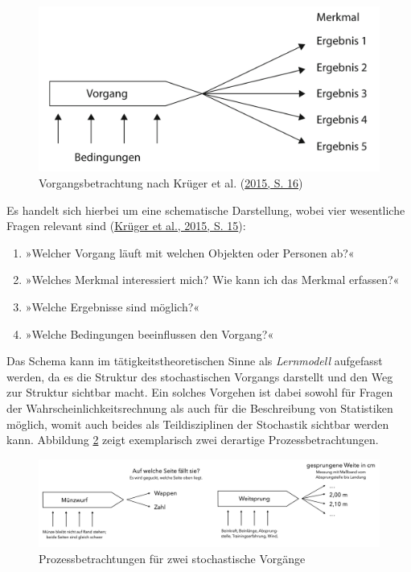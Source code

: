 \documentclass[
]{scrbook}
\providecommand{\tightlist}{%
  \setlength{\itemsep}{0pt}\setlength{\parskip}{0pt}}
\theoremstyle{definition}
\theoremstyle{definition}
\theoremstyle{definition}
\theoremstyle{definition}
\theoremstyle{remark}
\begin{document}
\begin{figure}

{\centering \includegraphics[width=0.75\linewidth]{pictures/14-Prozessbetrachtung} 

}

\caption{Vorgangsbetrachtung nach Krüger et al. (\protect\hyperlink{ref-Kruger2015}{2015, S. 16})}\label{fig:Prozessbetrachtung}
\end{figure}

Es handelt sich hierbei um eine schematische Darstellung, wobei vier wesentliche Fragen relevant sind (\protect\hyperlink{ref-Kruger2015}{Krüger et al., 2015, S. 15}):

\begin{enumerate}
\def\labelenumi{\arabic{enumi}.}
\tightlist
\item
  »Welcher Vorgang läuft mit welchen Objekten oder Personen ab?«
\item
  »Welches Merkmal interessiert mich? Wie kann ich das Merkmal erfassen?«
\item
  »Welche Ergebnisse sind möglich?«
\item
  »Welche Bedingungen beeinflussen den Vorgang?«
\end{enumerate}

Das Schema kann im tätigkeitstheoretischen Sinne als \emph{Lernmodell} aufgefasst werden, da es die Struktur des stochastischen Vorgangs darstellt und den Weg zur Struktur sichtbar macht. Ein solches Vorgehen ist dabei sowohl für Fragen der Wahrscheinlichkeitsrechnung als auch für die Beschreibung von Statistiken möglich, womit auch beides als Teildisziplinen der Stochastik sichtbar werden kann. Abbildung \ref{fig:Prozesse} zeigt exemplarisch zwei derartige Prozessbetrachtungen.

\begin{figure}

{\centering \includegraphics[width=0.95\linewidth]{pictures/14-Prozesse} 

}

\caption{Prozessbetrachtungen für zwei stochastische Vorgänge}\label{fig:Prozesse}
\end{figure}
\end{document}
